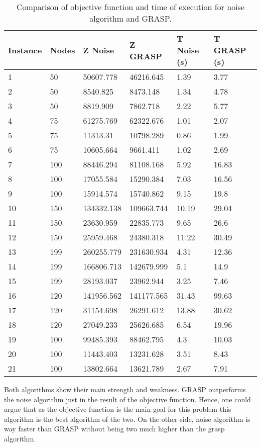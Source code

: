 \documentclass[10pt,twoside]{article}
\begin{document}
\begin{table}[H]
\centering
\begin{tabular}{llllll}
\hline
Instance & Nodes & Z Noise    & Z GRASP    & T Noise (s) & T GRASP (s) \\ \hline
1        & 50    & 50607.778  & 46216.645  & 1.39        & 3.77        \\
2        & 50    & 8540.825   & 8473.148   & 1.34        & 4.78        \\
3        & 50    & 8819.909   & 7862.718   & 2.22        & 5.77        \\
4        & 75    & 61275.769  & 62322.676  & 1.01        & 2.07        \\
5        & 75    & 11313.31   & 10798.289  & 0.86        & 1.99        \\
6        & 75    & 10605.664  & 9661.411   & 1.02        & 2.69        \\
7        & 100   & 88446.294  & 81108.168  & 5.92        & 16.83       \\
8        & 100   & 17055.584  & 15290.384  & 7.03        & 16.56       \\
9        & 100   & 15914.574  & 15740.862  & 9.15        & 19.8        \\
10       & 150   & 134332.138 & 109663.744 & 10.19       & 29.04       \\
11       & 150   & 23630.959  & 22835.773  & 9.65        & 26.6        \\
12       & 150   & 25959.468  & 24380.318  & 11.22       & 30.49       \\
13       & 199   & 260255.779 & 231630.934 & 4.31        & 12.36       \\
14       & 199   & 166806.713 & 142679.999 & 5.1         & 14.9        \\
15       & 199   & 28193.037  & 23962.944  & 3.25        & 7.46        \\
16       & 120   & 141956.562 & 141177.565 & 31.43       & 99.63       \\
17       & 120   & 31154.698  & 26291.612  & 13.88       & 30.62       \\
18       & 120   & 27049.233  & 25626.685  & 6.54        & 19.96       \\
19       & 100   & 99485.393  & 88462.795  & 4.3         & 10.03       \\
20       & 100   & 11443.403  & 13231.628  & 3.51        & 8.43        \\
21       & 100   & 13802.664  & 13621.789  & 2.67        & 7.91        \\ \hline
\end{tabular}
\caption{Comparison of objective function and time of execution for noise algorithm and GRASP.}
\label{tab:1}
\end{table}
Both algorithms show their main strength and weakness. GRASP
outperforms the noise algorithm just in the result of the objective
function. Hence, one could argue that as the objective function is
the main goal for this problem this algorithm is the best algorithm
of the two. On the other side, noise algorithm is way faster than
GRASP without being two much higher than the grasp algorithm.
\end{document}
